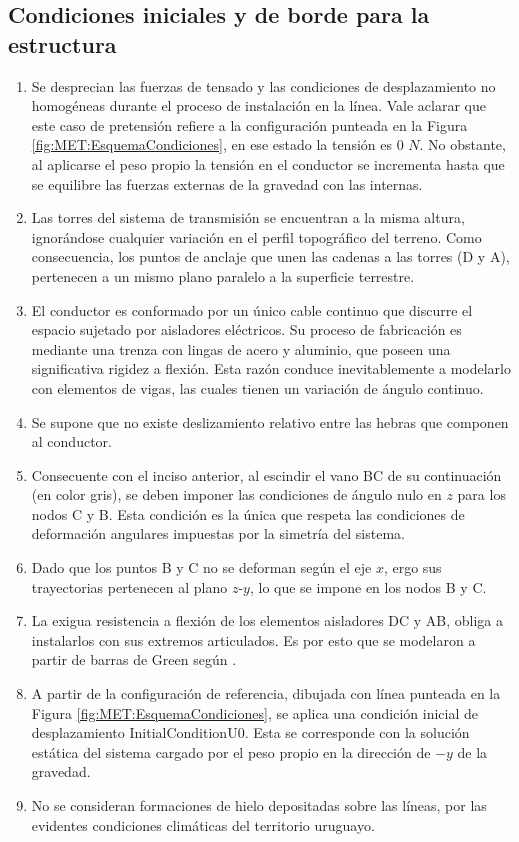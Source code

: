 \subsection{Condiciones iniciales y de borde para la estructura}\label{Sec:MET:ModeladoEstructural}
\begin{enumerate}
	\item  Se desprecian las fuerzas de tensado y las condiciones de desplazamiento no homogéneas durante el proceso de instalación en la línea. Vale aclarar que este caso de pretensión refiere a la configuración punteada en la Figura \ref{fig:MET:EsquemaCondiciones}, en ese estado la tensión es 0 $N$. No obstante, al aplicarse el peso propio la tensión en el conductor se incrementa hasta que se equilibre las fuerzas externas de la gravedad con las internas. 
	\item Las torres del sistema de transmisión se encuentran a la misma altura, ignorándose cualquier variación en el perfil topográfico del terreno. Como consecuencia, los puntos de anclaje que unen las cadenas a las torres (D y A), pertenecen a un mismo plano paralelo a la superficie terrestre.
	\item  El conductor es conformado por un único cable continuo que discurre el espacio sujetado por aisladores eléctricos. Su proceso de fabricación es mediante una trenza con lingas de acero y aluminio, que poseen una significativa rigidez a flexión. Esta razón conduce inevitablemente a modelarlo con elementos de vigas, las cuales tienen un variación de ángulo continuo.
	\item Se supone que no existe deslizamiento relativo entre las hebras que componen al conductor.  
	\item Consecuente con el inciso anterior, al escindir el vano BC de su continuación (en color gris), se deben imponer las condiciones de ángulo nulo en $z$ para los nodos C y B. Esta condición es la única que respeta las condiciones de deformación angulares impuestas por la simetría del sistema.
	\item Dado que los puntos B y C no se deforman según el eje $x$, ergo sus trayectorias pertenecen al plano $z$-$y$, lo que se impone en los nodos B y C. 
	\item La exigua resistencia a flexión de los elementos aisladores DC y AB, obliga a instalarlos con sus extremos articulados. Es por esto que se modelaron a partir de barras de Green según \cite{Crisfield}. 
	\item A partir de la configuración de referencia, dibujada con línea punteada en la Figura \ref{fig:MET:EsquemaCondiciones}, se aplica una condición inicial de desplazamiento \gls{InitialConditionU0}. Esta se corresponde con la solución estática del sistema cargado por el peso propio en la dirección de $-y$ de la gravedad.
	\item No se consideran formaciones de hielo depositadas sobre las líneas, por las evidentes condiciones climáticas del territorio uruguayo.
\end{enumerate} 

